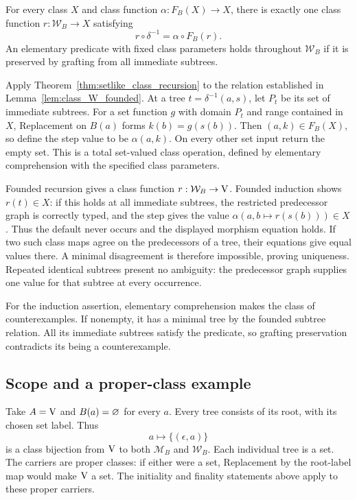 \begin{theorem}
\label{thm:class_W_initial}
For every class $X$ and class function $\alpha:F_B(X)\to X$, there
is exactly one class function $r:\mathcal W_B\to X$ satisfying
\[
r\circ\delta^{-1}=\alpha\circ F_B(r).
\]
An elementary predicate with fixed class parameters holds throughout
$\mathcal W_B$ if it is preserved by grafting from all immediate subtrees.
\end{theorem}
\Proof
Apply Theorem~\ref{thm:setlike_class_recursion} to the relation established
in Lemma~\ref{lem:class_W_founded}. At a tree $t=\delta^{-1}(a,s)$,
let $P_t$ be its set of immediate subtrees. For a set function $g$
with domain $P_t$ and range contained in $X$, Replacement on $B(a)$
forms $k(b)=g(s(b))$. Then $(a,k)\in F_B(X)$, so define the step
value to be $\alpha(a,k)$. On every other set input return the empty
set. This is a total set-valued class operation, defined by elementary
comprehension with the specified class parameters.

Founded recursion gives a class function $r:\mathcal W_B\to\mathrm{V}$.
Founded induction shows $r(t)\in X$: if this holds at all immediate
subtrees, the restricted predecessor graph is correctly typed, and the
step gives the value $\alpha(a,b\mapsto r(s(b)))\in X$. Thus the
default never occurs and the displayed morphism equation holds.
If two such class maps agree on the predecessors of a tree, their
equations give equal values there. A minimal disagreement is therefore
impossible, proving uniqueness. Repeated identical subtrees present no
ambiguity: the predecessor graph supplies one value for that subtree
at every occurrence.

For the induction assertion, elementary comprehension makes the class
of counterexamples. If nonempty, it has a minimal tree by the founded
subtree relation. All its immediate subtrees satisfy the predicate, so
grafting preservation contradicts its being a counterexample.
\Done

\subsection{Scope and a proper-class example}
\begin{example}
Take $A=\mathrm{V}$ and $B(a)=\varnothing$ for every $a$. Every tree consists
of its root, with its chosen set label. Thus
\[
a\longmapsto\{(\epsilon,a)\}
\]
is a class bijection from $\mathrm{V}$ to both $\mathcal M_B$ and
$\mathcal W_B$. Each individual tree is a set. The carriers are proper
classes: if either were a set, Replacement by the root-label map would
make $\mathrm{V}$ a set. The initiality and finality statements above apply
to these proper carriers.
\end{example}

